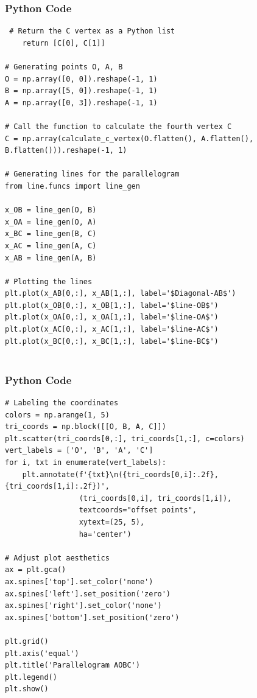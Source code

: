 \documentclass{beamer}
\begin{document}
\begin{frame}[fragile]
  \frametitle{Python Code }

\begin{verbatim}
 # Return the C vertex as a Python list
    return [C[0], C[1]]

# Generating points O, A, B
O = np.array([0, 0]).reshape(-1, 1)
B = np.array([5, 0]).reshape(-1, 1)
A = np.array([0, 3]).reshape(-1, 1)

# Call the function to calculate the fourth vertex C
C = np.array(calculate_c_vertex(O.flatten(), A.flatten(), B.flatten())).reshape(-1, 1)

# Generating lines for the parallelogram
from line.funcs import line_gen

x_OB = line_gen(O, B)
x_OA = line_gen(O, A)
x_BC = line_gen(B, C)
x_AC = line_gen(A, C)
x_AB = line_gen(A, B)

# Plotting the lines
plt.plot(x_AB[0,:], x_AB[1,:], label='$Diagonal-AB$')
plt.plot(x_OB[0,:], x_OB[1,:], label='$line-OB$')
plt.plot(x_OA[0,:], x_OA[1,:], label='$line-OA$')
plt.plot(x_AC[0,:], x_AC[1,:], label='$line-AC$')
plt.plot(x_BC[0,:], x_BC[1,:], label='$line-BC$')


\end{verbatim}
\end{frame}
\begin{frame}[fragile]
  \frametitle{Python Code }

\begin{verbatim}
# Labeling the coordinates
colors = np.arange(1, 5)
tri_coords = np.block([[O, B, A, C]])
plt.scatter(tri_coords[0,:], tri_coords[1,:], c=colors)
vert_labels = ['O', 'B', 'A', 'C']
for i, txt in enumerate(vert_labels):
    plt.annotate(f'{txt}\n({tri_coords[0,i]:.2f}, {tri_coords[1,i]:.2f})',
                 (tri_coords[0,i], tri_coords[1,i]),
                 textcoords="offset points",
                 xytext=(25, 5),
                 ha='center')

# Adjust plot aesthetics
ax = plt.gca()
ax.spines['top'].set_color('none')
ax.spines['left'].set_position('zero')
ax.spines['right'].set_color('none')
ax.spines['bottom'].set_position('zero')

plt.grid()
plt.axis('equal')
plt.title('Parallelogram AOBC')
plt.legend()
plt.show()

\end{verbatim}
\end{frame}
\end{document}
